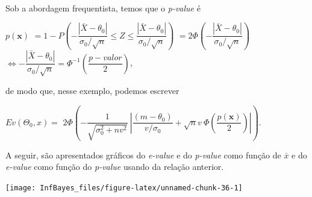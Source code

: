 \documentclass[
]{book}
\begin{document}
\(~\)

Sob a abordagem frequentista, temos que o \emph{p-value} é

\(p(\boldsymbol x)\)
\(= 1-P\left(-\dfrac{|\bar X-\theta_0|}{{\sigma}_0/\sqrt n}\leq Z \leq \dfrac{|\bar X-\theta_0|}{{\sigma}_0/\sqrt n}\right)\)
\(=2\Phi\left(-\dfrac{|\bar X-\theta_0|}{{\sigma}_0/\sqrt n}\right)\)
\(\Longleftrightarrow -\dfrac{|\bar X-\theta_0|}{{\sigma}_0/\sqrt n}=\Phi^{-1}\left(\dfrac{p-valor}{2}\right)\),

de modo que, nesse exemplo, podemos escrever

\(Ev(\Theta_0,x)=\) \(2\Phi\left(-\dfrac{1}{\sqrt{{\sigma}_0^2+nv^2}}~\left|\dfrac{(m-\theta_0)}{v/{\sigma}_0}+\sqrt nv~\Phi\left(\dfrac{p(\boldsymbol x)}{2}\right)\right|\right)\).

A seguir, são apresentados gráficos do \emph{e-value} e do \emph{p-value} como função de \(\bar{x}\) e do \emph{e-value} como função do \emph{p-value} usando da relação anterior.

\begin{center}\texttt{[image: InfBayes\_files/figure-latex/unnamed-chunk-36-1]} \end{center}
\end{document}
